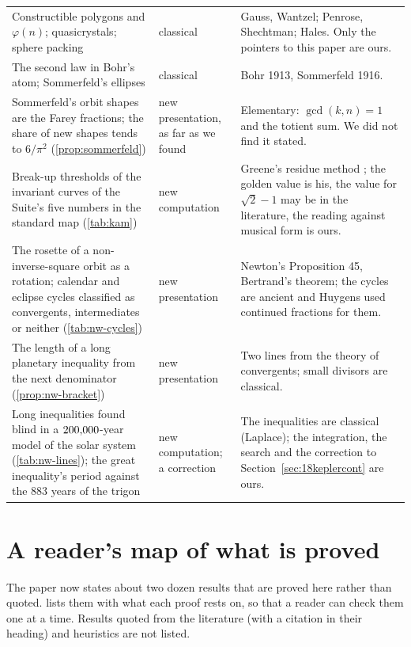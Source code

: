 \begin{longtable}{p{}p{}p{}}
Constructible polygons and $\varphi(n)$; quasicrystals; sphere packing \addedon{\revD} & classical & Gauss, Wantzel; Penrose, Shechtman; Hales. Only the pointers to this paper are ours. \\
The second law in Bohr's atom; Sommerfeld's ellipses \addedon{\revD} & classical & Bohr 1913, Sommerfeld 1916. \\
Sommerfeld's orbit shapes are the Farey fractions; the share of new shapes tends to $6/\pi^2$ (\cref{prop:sommerfeld}) \addedon{\revE} & new presentation, as far as we found & Elementary: $\gcd(k, n) = 1$ and the totient sum. We did not find it stated. \\
Break-up thresholds of the invariant curves of the Suite's five numbers in the standard map (\cref{tab:kam}) \addedon{\revE} & new computation & Greene's residue method \citep{Greene1979}; the golden value is his, the value for $\sqrt2 - 1$ may be in the literature, the reading against musical form is ours. \\
The rosette of a non-inverse-square orbit as a rotation; calendar and eclipse cycles classified as convergents, intermediates or neither (\cref{tab:nw-cycles}) \addedon{\revF} & new presentation & Newton's Proposition 45, Bertrand's theorem; the cycles are ancient and Huygens used continued fractions for them. \\
The length of a long planetary inequality from the next denominator (\cref{prop:nw-bracket}) \addedon{\revF} & new presentation & Two lines from the theory of convergents; small divisors are classical. \\
Long inequalities found blind in a $200{,}000$-year model of the solar system (\cref{tab:nw-lines}); the great inequality's period against the $883$ years of the trigon \addedon{\revF} & new computation; a correction & The inequalities are classical (Laplace); the integration, the search and the correction to Section~\ref{sec:18keplercont} are ours. \\
\end{longtable}

\section{A reader's map of what is proved}\label{sec:map}
\addednote{\revC}

The paper now states about two dozen results that are proved here rather than quoted.  lists them with what each proof rests on, so that a reader can check them one at a time. Results quoted from the literature (with a citation in their heading) and heuristics are not listed.

